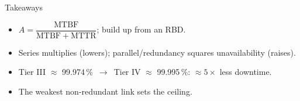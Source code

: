 \documentclass[aspectratio=169,10pt]{beamer}
\begin{document}
\begin{frame}[standout]{Takeaways}
  \begin{itemize}
    \item $A = \dfrac{\mathrm{MTBF}}{\mathrm{MTBF}+\mathrm{MTTR}}$; build up from an RBD.
    \item Series multiplies (lowers); parallel/redundancy squares unavailability (raises).
    \item Tier III $\approx$ 99.974\,\% $\,\to\,$ Tier IV $\approx$ 99.995\,\%: $\approx 5\times$ less downtime.
    \item The weakest non-redundant link sets the ceiling.
  \end{itemize}
\end{frame}
\end{document}
